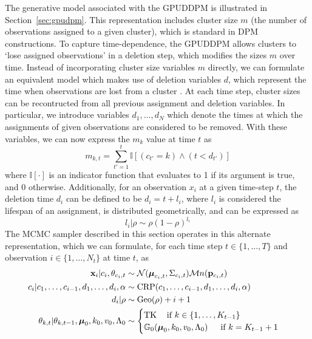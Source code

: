 \documentclass[smallcondensed, final]{svjour3}
\begin{document}
The generative model associated with the GPUDDPM is illustrated in Section~\ref{sec:gpudpm}. This representation includes cluster size $m$ (the number of observations assigned to a given cluster), which is standard in DPM constructions. To capture time-dependence, the GPUDDPM allows clusters to `lose assigned observations' in a deletion step, which modifies the sizes $m$ over time. Instead of incorporating cluster size variables $m$ directly, we can formulate an equivalent model which makes use of deletion variables $d$, which represent the time when observations are lost from a cluster . At each time step, cluster sizes can be recontructed from all previous assignment and deletion variables. In particular, we introduce variables $d_{1}, \ldots, d_{N}$ which denote the times at which the assignments of given observations are considered to be removed. With these variables, we can now express the $m_{k}$ value at time $t$ as
\begin{equation}
\label{compute_clust_size}
m_{k,t} = \sum_{t' = 1}^{t} \mathbb{I}[(c_{t'}=k) \wedge (t < d_{t'})]
\end{equation}
where $\mathbb{I}[\cdot]$ is an indicator function that evaluates to 1 if its argument is true, and 0 otherwise. Additionally, for an observation $x_{i}$ at a given time-step $t$, the deletion time $d_{i}$ can be defined to be $d_{i} = t + l_{i}$, where $l_{i}$ is considered the lifespan of an assignment, is distributed geometrically, and can be expressed as
\begin{equation}
\label{del_rho_form}
l_{i} | \rho  \sim  \rho(1 - \rho)^{l_{i}}
\end{equation}
The MCMC sampler described in this section operates in this alternate representation, which we can formulate, for each time step $t \in \{1, \ldots, T\}$ and observation $i \in \{ 1, \ldots, N_{t} \}$ at time $t$, as
\begin{align}
\begin{split}
	 \bold{x}_{i} | c_{i}, \theta_{c_{i},t} &\sim \mathcal{N}(\boldsymbol{\mu}_{c_{i},t}, \Sigma_{c_{i},t})  \mathcal{M}n(\bold{p}_{c_{i},t}) \\
	c_{i} | c_{1}, \ldots, c_{i-1}, d_{1}, \ldots, d_{i}, \alpha  &\sim  \text{CRP}(c_{1}, \ldots, c_{i-1}, d_{1}, \ldots, d_{i}, \alpha) \\
	d_{i} | \rho  &\sim \text{Geo}(\rho) + i + 1\\
	\theta_{k, t} | \theta_{k, t-1}, \boldsymbol{\mu}_{0}, k_{0}, v_{0}, \Lambda_{0}  &\sim 
\begin{cases}
	\text{TK} \hspace{12pt} \text{if } k \in \{ 1, \ldots, K_{t-1}  \} \\
	\mathbb{G}_{0}(\boldsymbol{\mu}_{0}, k_{0}, v_{0}, \Lambda_{0})  \hspace{15pt} \text{if } k = K_{t-1} + 1
\end{cases}
\end{split}
\end{align}
\end{document}
